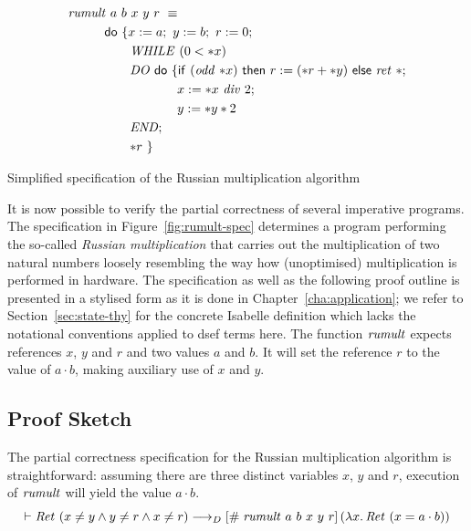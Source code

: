 \begin{myfigure}
  \centering
  \newcommand{\filla}{\hspace*{1cm}}
  \newcommand{\fillaa}{\hspace*{17mm}}
  \newcommand{\fillaaa}{\hspace*{3cm}}
  \newcommand{\assgn}{\;{:=}\;}
  \begin{align*}
    & \op{rumult}\ a\ b\ x\ y\ r\ \equiv\\
    & \filla \DO\ \{ x \assgn a;\ y \assgn b;\ r \assgn 0;\\
    & \fillaa       \op{WHILE}\ (0 < \rd{x})\\
    & \fillaa       \op{DO}\ \DO\ \{\If\ (\op{odd}\ \rd{x})\ \Then\ r\assgn (\rd{r} +
    \rd{y})\ \Else\ \ret\ \unit;\\
    & \fillaaa          x\assgn \rd{x}\ \op{div}\ 2;\\
    & \fillaaa          y\assgn \rd{y} * 2\\
    & \fillaa          \op{END};\\
    & \fillaa          \rd{r}\ \}
  \end{align*}
  \mylinesep
  \caption{Simplified specification of the Russian multiplication algorithm}
  \label{fig:rumult-spec}
\end{myfigure}

It is now possible to verify the partial correctness of several imperative
programs. The specification in Figure~\ref{fig:rumult-spec} determines a program
performing the so-called \emph{Russian multiplication} that carries out the
multiplication of two natural numbers loosely resembling the way how
(unoptimised) multiplication is performed in hardware. The specification as well
as the following proof outline is presented in a stylised form as it is done in
Chapter~\ref{cha:application}; we refer to Section~\ref{sec:state-thy} for the
concrete Isabelle definition which lacks the notational conventions applied to
dsef terms here. The function $\mathit{rumult}$ expects references $x$, $y$ and $r$
and two values $a$ and $b$. It will set the reference $r$ to the value of $a\cdot
b$, making auxiliary use of $x$ and $y$.


\subsection{Proof Sketch}
The partial correctness specification for the Russian multiplication algorithm
is straightforward: assuming there are three distinct variables $x$, $y$ and
$r$, execution of $\mathit{rumult}$ will yield the value $a\cdot b$.
\[
\vdash \mathit{Ret}\ (x\neq y \land y\neq r \land x\neq r) \longrightarrow_D [\#\;\mathit{rumult}\ a\ b\ x\ y\
  r]\,{({\lambda x.\,\mathit{Ret}\ (x = a\cdot b)})}
\]

